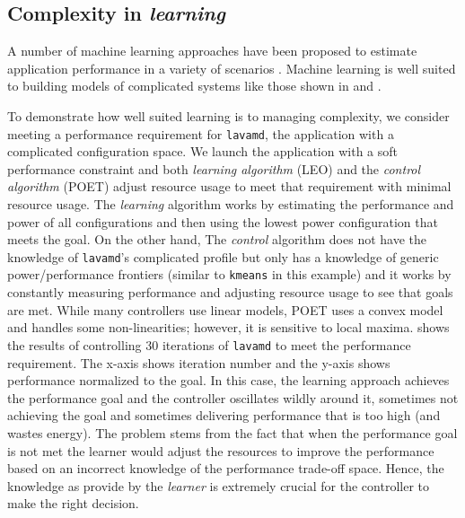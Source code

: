 \subsection{Complexity in \emph{learning}}
A number of machine learning approaches have been proposed to estimate
application performance in a variety of scenarios
\cite{reddiHPCA2013,LeeBrooks2006,CPR,ParallelismDial,Flicker,LeeBrooks,Koala}.
Machine learning is well suited to building models of complicated
systems like those shown in  and  . 

To demonstrate how well suited learning is to managing complexity, we
consider meeting a performance requirement for \texttt{lavamd}, the
application with a complicated configuration space.  We launch
the application with a soft performance constraint and both \emph{learning algorithm} (LEO) and the \emph{control algorithm}
(POET) adjust resource usage to meet that requirement with minimal
resource usage.  The \emph{learning} algorithm works by estimating the performance and power of
all configurations and then using the lowest power configuration that
meets the goal. 
On the other hand, The \emph{control} algorithm does not have the knowledge of \texttt{lavamd}'s complicated profile but only has a knowledge of generic power/performance frontiers (similar to \texttt{kmeans} in this example) and it works by constantly measuring performance and
adjusting resource usage to see that goals are met.  While many
controllers use linear models, POET uses a convex model and handles
some non-linearities; however, it is sensitive to local maxima.
 shows the results of controlling 30 iterations
of \texttt{lavamd} to meet the performance requirement.  The x-axis
shows iteration number and the y-axis shows performance normalized to
the goal.  %
In this case, the learning approach
achieves the performance goal and the controller oscillates wildly
around it, sometimes not achieving the goal and sometimes delivering
performance that is too high (and wastes energy). The problem stems from the fact that when the performance goal is not met the learner would adjust the resources to improve the performance based on an incorrect knowledge of the performance trade-off space. Hence, the knowledge as provide by the \emph{learner} is extremely crucial for the controller to make the right decision.

